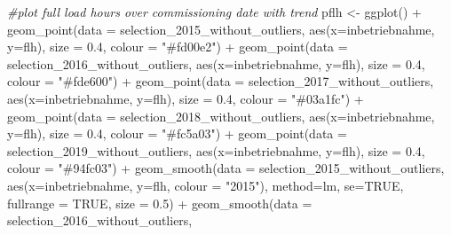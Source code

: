 \documentclass[a4paper,11pt]{article}
\newenvironment{Shaded}{\begin{snugshade}}{\end{snugshade}}
\newcommand{\AttributeTok}[1]{\textcolor[rgb]{0.77,0.63,0.00}{#1}}
\newcommand{\CommentTok}[1]{\textcolor[rgb]{0.56,0.35,0.01}{\textit{#1}}}
\newcommand{\ConstantTok}[1]{\textcolor[rgb]{0.00,0.00,0.00}{#1}}
\newcommand{\FloatTok}[1]{\textcolor[rgb]{0.00,0.00,0.81}{#1}}
\newcommand{\FunctionTok}[1]{\textcolor[rgb]{0.00,0.00,0.00}{#1}}
\newcommand{\NormalTok}[1]{#1}
\newcommand{\OtherTok}[1]{\textcolor[rgb]{0.56,0.35,0.01}{#1}}
\newcommand{\SpecialCharTok}[1]{\textcolor[rgb]{0.00,0.00,0.00}{#1}}
\newcommand{\StringTok}[1]{\textcolor[rgb]{0.31,0.60,0.02}{#1}}
\begin{document}
\begin{Shaded}
\begin{Highlighting}[]
\CommentTok{\#plot full load hours over commissioning date with trend}
\NormalTok{pflh }\OtherTok{\textless{}{-}} \FunctionTok{ggplot}\NormalTok{() }\SpecialCharTok{+}
  \FunctionTok{geom\_point}\NormalTok{(}\AttributeTok{data =}\NormalTok{ selection\_2015\_without\_outliers, }
             \FunctionTok{aes}\NormalTok{(}\AttributeTok{x=}\NormalTok{inbetriebnahme, }\AttributeTok{y=}\NormalTok{flh), }\AttributeTok{size =} \FloatTok{0.4}\NormalTok{, }\AttributeTok{colour =} \StringTok{"\#fd00e2"}\NormalTok{) }\SpecialCharTok{+}
  \FunctionTok{geom\_point}\NormalTok{(}\AttributeTok{data =}\NormalTok{ selection\_2016\_without\_outliers, }
             \FunctionTok{aes}\NormalTok{(}\AttributeTok{x=}\NormalTok{inbetriebnahme, }\AttributeTok{y=}\NormalTok{flh), }\AttributeTok{size =} \FloatTok{0.4}\NormalTok{, }\AttributeTok{colour =} \StringTok{"\#fde600"}\NormalTok{) }\SpecialCharTok{+}
  \FunctionTok{geom\_point}\NormalTok{(}\AttributeTok{data =}\NormalTok{ selection\_2017\_without\_outliers, }
             \FunctionTok{aes}\NormalTok{(}\AttributeTok{x=}\NormalTok{inbetriebnahme, }\AttributeTok{y=}\NormalTok{flh), }\AttributeTok{size =} \FloatTok{0.4}\NormalTok{, }\AttributeTok{colour =} \StringTok{"\#03a1fc"}\NormalTok{) }\SpecialCharTok{+}
  \FunctionTok{geom\_point}\NormalTok{(}\AttributeTok{data =}\NormalTok{ selection\_2018\_without\_outliers, }
             \FunctionTok{aes}\NormalTok{(}\AttributeTok{x=}\NormalTok{inbetriebnahme, }\AttributeTok{y=}\NormalTok{flh), }\AttributeTok{size =} \FloatTok{0.4}\NormalTok{, }\AttributeTok{colour =} \StringTok{"\#fc5a03"}\NormalTok{) }\SpecialCharTok{+}
  \FunctionTok{geom\_point}\NormalTok{(}\AttributeTok{data =}\NormalTok{ selection\_2019\_without\_outliers,}
             \FunctionTok{aes}\NormalTok{(}\AttributeTok{x=}\NormalTok{inbetriebnahme, }\AttributeTok{y=}\NormalTok{flh), }\AttributeTok{size =} \FloatTok{0.4}\NormalTok{, }\AttributeTok{colour =} \StringTok{"\#94fc03"}\NormalTok{) }\SpecialCharTok{+}
  \FunctionTok{geom\_smooth}\NormalTok{(}\AttributeTok{data =}\NormalTok{ selection\_2015\_without\_outliers, }
              \FunctionTok{aes}\NormalTok{(}\AttributeTok{x=}\NormalTok{inbetriebnahme, }\AttributeTok{y=}\NormalTok{flh, }\AttributeTok{colour =} \StringTok{"2015"}\NormalTok{), }
              \AttributeTok{method=}\NormalTok{lm, }\AttributeTok{se=}\ConstantTok{TRUE}\NormalTok{, }\AttributeTok{fullrange =} \ConstantTok{TRUE}\NormalTok{, }\AttributeTok{size =} \FloatTok{0.5}\NormalTok{)  }\SpecialCharTok{+}
  \FunctionTok{geom\_smooth}\NormalTok{(}\AttributeTok{data =}\NormalTok{ selection\_2016\_without\_outliers, }

\end{Highlighting}
\end{Shaded}
\end{document}
